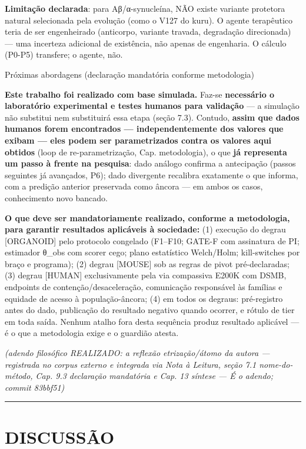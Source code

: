 \documentclass[12pt,a4paper,oneside]{report}
\begin{document}
\textbf{Limitação declarada}: para Aβ/α-synucleína, NÃO existe variante
protetora natural selecionada pela evolução (como o V127 do kuru). O
agente terapêutico teria de ser engenheirado (anticorpo, variante
travada, degradação direcionada) --- uma incerteza adicional de
existência, não apenas de engenharia. O cálculo (P0-P5) transfere; o
agente, não.

Próximas abordagens (declaração mandatória conforme metodologia)

\textbf{Este trabalho foi realizado com base simulada.} Faz-se
\textbf{necessário o laboratório experimental e testes humanos para
validação} --- a simulação não substitui nem substituirá essa etapa
(seção 7.3). Contudo, \textbf{assim que dados humanos forem encontrados
--- independentemente dos valores que exibam --- eles podem ser
parametrizados contra os valores aqui obtidos} (loop de
re-parametrização, Cap. metodologia), o que \textbf{já representa um
passo à frente na pesquisa}: dado análogo confirma a antecipação (passos
seguintes já avançados, P6); dado divergente recalibra exatamente o que
informa, com a predição anterior preservada como âncora --- em ambos os
casos, conhecimento novo bancado.

\textbf{O que deve ser mandatoriamente realizado, conforme a
metodologia, para garantir resultados aplicáveis à sociedade:} (1)
execução do degrau {[}ORGANOID{]} pelo protocolo congelado (F1--F10;
GATE-F com assinatura de PI; estimador θ\_obs com scorer cego; plano
estatístico Welch/Holm; kill-switches por braço e programa); (2) degrau
{[}MOUSE{]} sob as regras de pivot pré-declaradas; (3) degrau
{[}HUMAN{]} exclusivamente pela via compassiva E200K com DSMB, endpoints
de contenção/desaceleração, comunicação responsável às famílias e
equidade de acesso à população-âncora; (4) em todos os degraus:
pré-registro antes do dado, publicação do resultado negativo quando
ocorrer, e rótulo de tier em toda saída. Nenhum atalho fora desta
sequência produz resultado aplicável --- é o que a metodologia exige e o
guardião atesta.

\emph{(adendo filosófico REALIZADO: a reflexão etrização/átomo da autora
--- registrada no corpus externo e integrada via Nota à Leitura, seção
7.1 nome-do-método, Cap. 9.3 declaração mandatória e Cap. 13 síntese ---
É o adendo; commit 83bbf51)}

\begin{center}\rule{0.5\linewidth}{0.5pt}\end{center}

\hypertarget{discussuxe3o}{%
\chapter{DISCUSSÃO}\label{discussuxe3o}}
\end{document}
